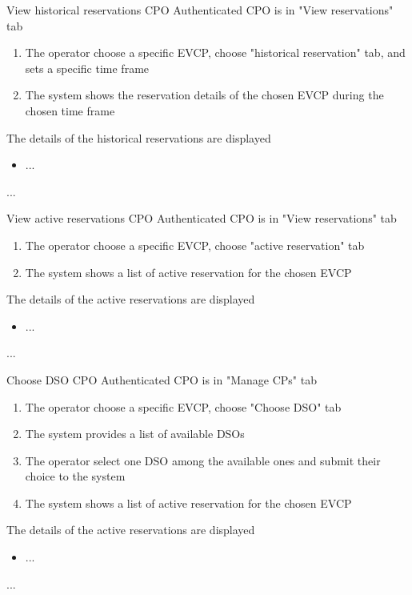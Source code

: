 \usecase
{View historical reservations} %
{CPO} %
{Authenticated CPO is in "View reservations" tab} %
{ %
    \begin{enumerate}
        \item The operator choose a specific EVCP, choose "historical reservation" tab, and sets a specific time frame
        \item The system shows the reservation details of the chosen EVCP during the chosen time frame
    \end{enumerate}
}
{The details of the historical reservations are displayed} %
{ %
    \begin{itemize}
        \item ...
    \end{itemize}
}
{ %
...
}

\usecase
{View active reservations} %
{CPO} %
{Authenticated CPO is in "View reservations" tab} %
{ %
    \begin{enumerate}
        \item The operator choose a specific EVCP, choose "active reservation" tab
        \item The system shows a list of active reservation for the chosen EVCP
    \end{enumerate}
}
{The details of the active reservations are displayed} %
{ %
    \begin{itemize}
        \item ...
    \end{itemize}
}
{ %
...
}

\usecase
{Choose DSO} %
{CPO} %
{Authenticated CPO is in "Manage CPs" tab} %
{ %
    \begin{enumerate}
        \item The operator choose a specific EVCP, choose "Choose DSO" tab
        \item The system provides a list of available DSOs
        \item The operator select one DSO among the available ones and submit their choice to the system
        \item The system shows a list of active reservation for the chosen EVCP
    \end{enumerate}
}
{The details of the active reservations are displayed} %
{ %
    \begin{itemize}
        \item ...
    \end{itemize}
}
{ %
...
}

